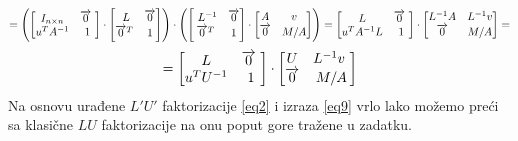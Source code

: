 \documentclass[11pt]{article}
\begin{document}
\begin{equation*}
=
\left(
\begin{bmatrix}
I_{n \times n} & \overrightarrow{0}\ \\ u^TA^{-1} & 1
\end{bmatrix}
\cdot
\begin{bmatrix}
\ L & \overrightarrow{0}\\
\overrightarrow{0}^T & 1
\end{bmatrix}
\right)
\cdot
\left(
\begin{bmatrix}
\ L^{-1} & \overrightarrow{0}\\
\overrightarrow{0}^T & 1
\end{bmatrix}
\cdot
\begin{bmatrix}
A & v \\ \overrightarrow{0} & M/A
\end{bmatrix}
\right)
=
\begin{bmatrix}
L & \overrightarrow{0} \ \\ u^TA^{-1}L & 1
\end{bmatrix}
\cdot
\begin{bmatrix}
L^{-1}A & L^{-1}v \\ \overrightarrow{0} & M/A
\end{bmatrix}
=\vspace{3mm}
\end{equation*}
\begin{equation*}
=
\begin{bmatrix}
L & \overrightarrow{0} \ \\ u^TU^{-1} & 1
\end{bmatrix}
\cdot
\begin{bmatrix}
U & L^{-1}v \ \\ \overrightarrow{0} & M/A
\end{bmatrix}
\vspace{3mm}
\end{equation*}
Na osnovu urađene $L'U'$ faktorizacije \eqref{eq2} i izraza \eqref{eq9} vrlo lako možemo preći sa klasične $LU$ faktorizacije na onu poput gore tražene u zadatku.
\end{document}
